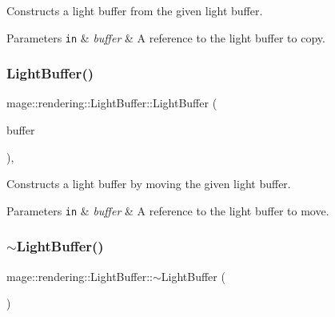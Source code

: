 Constructs a light buffer from the given light buffer.


\begin{DoxyParams}[1]{Parameters}
\mbox{\tt in}  & {\em buffer} & A reference to the light buffer to copy. \\
\hline
\end{DoxyParams}
\mbox{\label{structmage_1_1rendering_1_1_light_buffer_a016cbba8dd68da2f80a7018e2276070d}} 
\subsubsection{\texorpdfstring{Light\+Buffer()}{LightBuffer()}\hspace{0.1cm}{\footnotesize\ttfamily [3/3]}}
{\footnotesize\ttfamily mage\+::rendering\+::\+Light\+Buffer\+::\+Light\+Buffer (\begin{DoxyParamCaption}\item[{\mbox{\hyperlink{structmage_1_1rendering_1_1_light_buffer}{Light\+Buffer}} \&\&}]{buffer }\end{DoxyParamCaption})\hspace{0.3cm}{\ttfamily [default]}, {\ttfamily [noexcept]}}

Constructs a light buffer by moving the given light buffer.


\begin{DoxyParams}[1]{Parameters}
\mbox{\tt in}  & {\em buffer} & A reference to the light buffer to move. \\
\hline
\end{DoxyParams}
\mbox{\label{structmage_1_1rendering_1_1_light_buffer_a36fd7699f61cde6359d6934428eb9daf}} 
\subsubsection{\texorpdfstring{$\sim$\+Light\+Buffer()}{~LightBuffer()}}
{\footnotesize\ttfamily mage\+::rendering\+::\+Light\+Buffer\+::$\sim$\+Light\+Buffer (\begin{DoxyParamCaption}{ }\end{DoxyParamCaption})\hspace{0.3cm}{\ttfamily [default]}}

